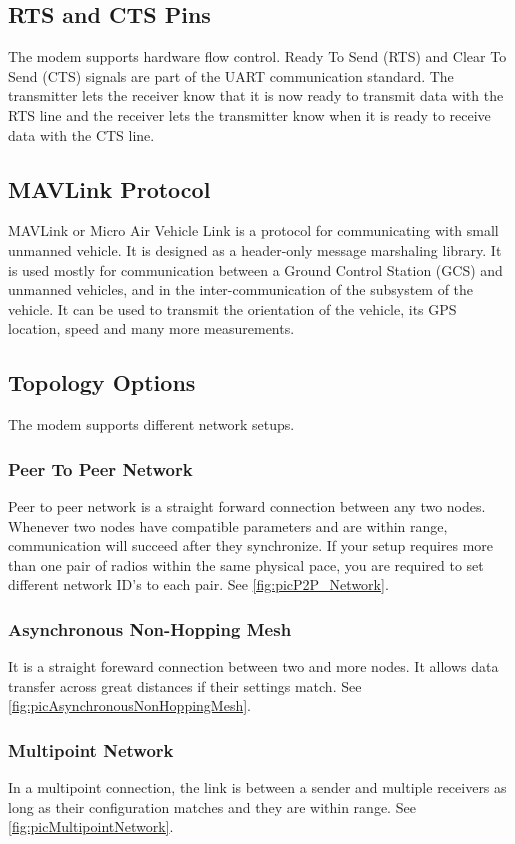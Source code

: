 \subsection{RTS and CTS Pins}
The modem supports hardware flow control. Ready To Send (RTS) and Clear To Send (CTS) signals are part of the UART communication standard. The transmitter lets the receiver know that it is now ready to transmit data with the RTS line and the receiver lets the transmitter know when it is ready to receive data with the CTS line.
%
%
\subsection{MAVLink Protocol}
MAVLink or Micro Air Vehicle Link is a protocol for communicating with small unmanned vehicle. It is designed as a header-only message marshaling library. It is used mostly for communication between a Ground Control Station (GCS) and unmanned vehicles, and in the inter-communication of the subsystem of the vehicle. It can be used to transmit the orientation of the vehicle, its GPS location, speed and many more measurements.

%
%
\subsection{Topology Options}
The modem supports different network setups.
%
\subsubsection{Peer To Peer Network}
%
Peer to peer network is a straight forward connection between any two nodes. Whenever  two  nodes  have compatible  parameters  and  are within range, communication will succeed after they synchronize. If your setup requires more than one pair of radios within the same physical pace, you are required to set different  network ID’s to each pair. See \autoref{fig:picP2P_Network}.
%
\subsubsection{Asynchronous Non-Hopping Mesh}
%
It is a straight foreward connection between two and more nodes. It allows data transfer across great distances if their settings match. See \autoref{fig:picAsynchronousNonHoppingMesh}.
%
\subsubsection{Multipoint Network}
%
In a multipoint connection, the link is between a sender and multiple receivers as long as their configuration matches and they are within range. See \autoref{fig:picMultipointNetwork}.
%
%
